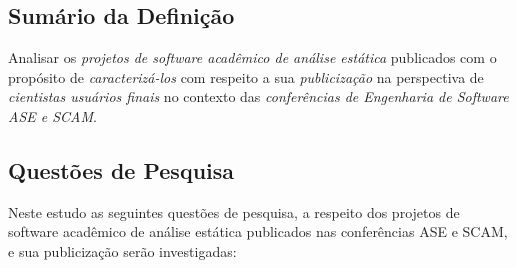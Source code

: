 \subsection{Sumário da Definição}

Analisar os \textit{projetos de software acadêmico de análise estática} publicados
com o propósito de \textit{caracterizá-los} 
com respeito a sua \textit{publicização}
na perspectiva de \textit{cientistas usuários finais}
no contexto das \textit{conferências de Engenharia de Software ASE e SCAM}.

\subsection{Questões de Pesquisa}

Neste estudo as seguintes questões de pesquisa, a respeito dos projetos de
software acadêmico de análise estática publicados nas conferências ASE e SCAM,
e sua publicização serão investigadas:

\newcommand{\EstudoUmQuestaoUm}{
  Os projetos de software acadêmico de análise estática publicados nas
  conferências ASE e SCAM possuem alguma presença oficial online?
}
\newcommand{\EstudoUmQuestaoDois}{
  Os projetos de software acadêmico de análise estática publicados nas
  conferências ASE e SCAM estão disponíveis para download?
}
\newcommand{\EstudoUmQuestaoTres}{
  É possível ter acesso ao código-fonte dos projetos de software de análise
  estática publicados nas conferências ASE e SCAM?
}
\newcommand{\EstudoUmQuestaoQuatro}{
  Os projetos de software com código-fonte disponível usam licenças de software
  livre?
}

